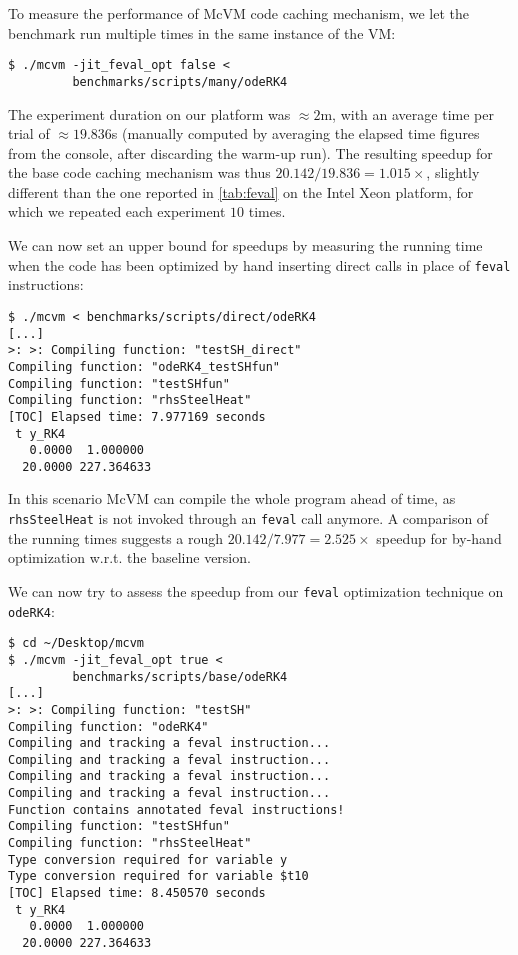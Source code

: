 \noindent To measure the performance of McVM code caching mechanism, we let the benchmark run multiple times in the same instance of the VM:

\begin{small}
\begin{verbatim}
$ ./mcvm -jit_feval_opt false <
         benchmarks/scripts/many/odeRK4
\end{verbatim}
\end{small}

\noindent The experiment duration on our platform was $\approx2$m, with an average time per trial of $\approx 19.836$s (manually computed by averaging the elapsed time figures from the console, after discarding the warm-up run). The resulting speedup for the base code caching mechanism was thus $20.142/19.836=1.015\times$, slightly different than the one reported in \mytable\ref{tab:feval} on the Intel Xeon platform, for which we repeated each experiment $10$ times.

We can now set an upper bound for speedups by measuring the running time when the code has been optimized by hand inserting direct calls in place of {\tt feval} instructions:

\begin{small}
\begin{verbatim}
$ ./mcvm < benchmarks/scripts/direct/odeRK4
[...]
>: >: Compiling function: "testSH_direct"
Compiling function: "odeRK4_testSHfun"
Compiling function: "testSHfun"
Compiling function: "rhsSteelHeat"
[TOC] Elapsed time: 7.977169 seconds
 t y_RK4
   0.0000  1.000000
  20.0000 227.364633
\end{verbatim}
\end{small}

\noindent In this scenario McVM can compile the whole program ahead of time, as {\tt rhsSteelHeat} is not invoked through an {\tt feval} call anymore. A comparison of the running times suggests a rough $20.142/7.977=2.525\times$ speedup for by-hand optimization w.r.t. the baseline version.

We can now try to assess the speedup from our {\tt feval} optimization technique on {\tt odeRK4}:

\begin{small}
\begin{verbatim}
$ cd ~/Desktop/mcvm
$ ./mcvm -jit_feval_opt true <
         benchmarks/scripts/base/odeRK4
[...]
>: >: Compiling function: "testSH"
Compiling function: "odeRK4"
Compiling and tracking a feval instruction...
Compiling and tracking a feval instruction...
Compiling and tracking a feval instruction...
Compiling and tracking a feval instruction...
Function contains annotated feval instructions!
Compiling function: "testSHfun"
Compiling function: "rhsSteelHeat"
Type conversion required for variable y
Type conversion required for variable $t10
[TOC] Elapsed time: 8.450570 seconds
 t y_RK4
   0.0000  1.000000
  20.0000 227.364633
\end{verbatim}
\end{small}

